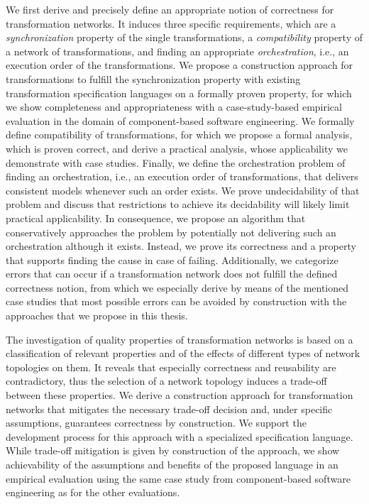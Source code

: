 We first derive and precisely define an appropriate notion of correctness for transformation networks.
It induces three specific requirements, which are a \emph{synchronization} property of the single transformations, a \emph{compatibility} property of a network of transformations, and finding an appropriate \emph{orchestration}, i.e., an execution order of the transformations.
We propose a construction approach for transformations to fulfill the synchronization property with existing transformation specification languages on a formally proven property, for which we show completeness and appropriateness with a case-study-based empirical evaluation in the domain of component-based software engineering.
We formally define compatibility of transformations, for which we propose a formal analysis, which is proven correct, and derive a practical analysis, whose applicability we demonstrate with case studies.
Finally, we define the orchestration problem of finding an orchestration, i.e., an execution order of transformations, that delivers consistent models whenever such an order exists.
We prove undecidability of that problem and discuss that restrictions to achieve its decidability will likely limit practical applicability.
In consequence, we propose an algorithm that conservatively approaches the problem by potentially not delivering such an orchestration although it exists.
Instead, we prove its correctness and a property that supports finding the cause in case of failing.
Additionally, we categorize errors that can occur if a transformation network does not fulfill the defined correctness notion, from which we especially derive by means of the mentioned case studies that most possible errors can be avoided by construction with the approaches that we propose in this thesis.

The investigation of quality properties of transformation networks is based on a classification of relevant properties and of the effects of different types of network topologies on them.
It reveals that especially correctness and reusability are contradictory, thus the selection of a network topology induces a trade-off between these properties.
We derive a construction approach for transformation networks that mitigates the necessary trade-off decision and, under specific assumptions, guarantees correctness by construction.
We support the development process for this approach with a specialized specification language.
While trade-off mitigation is given by construction of the approach, we show achievability of the assumptions and benefits of the proposed language in an empirical evaluation using the same case study from component-based software engineering as for the other evaluations.

